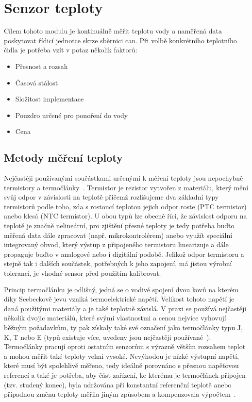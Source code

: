 \section{Senzor teploty}
\label{sec:perif-sensor-teploty}
    Cílem tohoto modulu je kontinuálně měřit teplotu vody a naměřená data poskytovat řídicí jednotce skrze sběrnici \acs{can}. Při volbě konkrétního teplotního čidla je potřeba vzít v potaz několik faktorů:
    \begin{itemize}
        \item Přesnost a rozsah
        \item Časová stálost
        \item Složitost implementace 
        \item Pouzdro určené pro ponoření do vody
        \item Cena
    \end{itemize}

    \subsection{Metody měření teploty}
        Nejčastěji používanými součástkami určenými k měření teploty jsou nepochybně termistory a termočlánky~\cite{allaboutcircuits2023tempsensors}. Termistor je rezistor vytvořen z materiálu, který mění svůj odpor v závislosti na teplotě přičemž rozlišujeme dva základní typy termistorů podle toho, zda s rostoucí teplotou jejich odpor roste (PTC termistor) anebo klesá (NTC termistor). U obou typů lze obecně říci, že závislost odporu na teplotě je značně nelineární, pro zjištění přesné teploty je tedy potřeba buďto měřená data dále zpracovat (např. mikrokontrolérem) anebo využít speciální integrovaný obvod, který výstup z připojeného termistoru linearizuje a dále propaguje buďto v analogové nebo i digitální podobě. Jelikož odpor termistoru a stejně tak i dalších součástek, potřebných k jeho zapojení, má jistou výrobní toleranci, je vhodné sensor před použitím kalibrovat.

        Princip termočlánku je odlišný, jedná se o vodivé spojení dvou kovů na kterém díky Seebeckově jevu vzniká termoelektrické napětí. Velikost tohoto napětí je daná použitými materiály a je také teplotně závislá. V praxi se používá nejčastěji několik dvojic materiálů, které svými vlastnostmi a cenou nejvíce vyhovují běžným požadavkům, ty pak získaly také své označení jako termočlánky typu J, K, T nebo E (typů existuje více, uvedeny jsou nejčastěji používané~\cite{TechieScience_Thermocouples}). Termočlánky pracují oproti ostatním senzorům s výrazně větším rozsahem teplot a mohou měřit také teploty velmi vysoké. Nevýhodou je nízké výstupní napětí, které musí být spolehlivě měřeno, tedy ideálně porovnáno s přesnou napěťovou referencí a také je potřeba, aby část zařízení, ke kterému je termočlánek připojen (tzv. studený konec), byla udržována při konstantní referenční teplotě anebo případnou změnu teploty měřila jiným způsobem a kompenzovala výpočtem~\cite{allaboutcircuits2023tempsensors,TechieScience_Thermocouples}.

